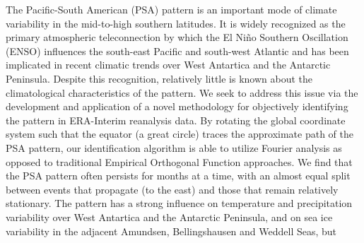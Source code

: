 The Pacific-South American (PSA) pattern is an important mode of climate variability in the mid-to-high southern latitudes. It is widely recognized as the primary atmospheric teleconnection by which the El Ni\~{n}o Southern Oscillation (ENSO) influences the south-east Pacific and south-west Atlantic and has been implicated in recent climatic trends over West Antartica and the Antarctic Peninsula. Despite this recognition, relatively little is known about the climatological characteristics of the pattern. We seek to address this issue via the development and application of a novel methodology for objectively identifying the pattern in ERA-Interim reanalysis data. By rotating the global coordinate system such that the equator (a great circle) traces the approximate path of the PSA pattern, our identification algorithm is able to utilize Fourier analysis as opposed to traditional Empirical Orthogonal Function approaches. We find that the PSA pattern often persists for months at a time, with an almost equal split between events that propagate (to the east) and those that remain relatively stationary. The pattern has a strong influence on temperature and precipitation variability over West Antartica and the Antarctic Peninsula, and on sea ice variability in the adjacent Amundsen, Bellingshausen and Weddell Seas, but 